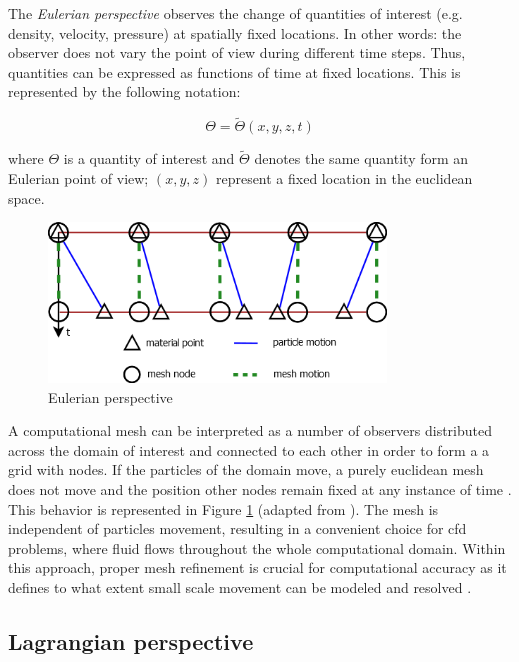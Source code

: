 The \textit{Eulerian perspective} observes the change of quantities of interest (e.g. density, velocity, pressure) at spatially fixed locations. In other words: the observer does not vary the point of view during different time steps. Thus, quantities can be expressed as functions of time at fixed locations. 
This is represented by the following notation:

\begin{equation}
	\Theta = \tilde{\Theta}(x,y,z,t)
	\label{eq:eulerian}
\end{equation}

where $\Theta$ is a quantity of interest and $\tilde{\Theta}$ denotes the same quantity form an Eulerian point of view; $(x, y, z)$ represent a fixed location in the euclidean space.


\begin{figure}[htbp!]
	\centering
	\includegraphics[width=0.8\textwidth]{images/eulerian}
	\caption{Eulerian perspective}
	\label{fig:eulerian}
\end{figure}

A computational mesh can be interpreted as a number of observers distributed across the domain of interest and connected to each other in order to form a a grid with nodes. If the particles of the domain move, a purely euclidean mesh does not move and the position other nodes remain fixed at any instance of time \cite{Cheng2006SlidingFL}. 
This behavior is represented in Figure \ref{fig:eulerian} (adapted from \cite{Cheng2006SlidingFL}). The mesh is independent of particles movement, resulting in a convenient choice for \acrfull{cfd} problems, where fluid flows throughout the whole
computational domain. Within this approach, proper mesh refinement is crucial for computational accuracy as it defines to what extent small scale movement can be modeled and resolved \cite{donea2017arbitrary}.

\subsection{Lagrangian perspective}
\label{subsec:lagrange}

